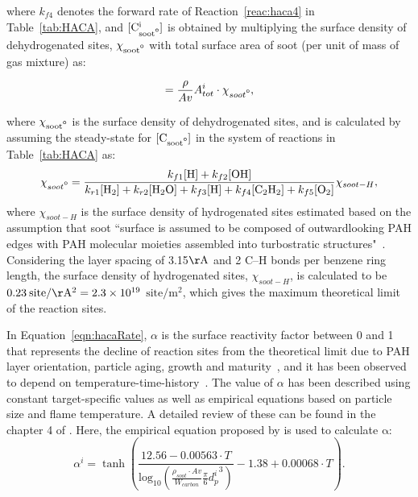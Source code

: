 \noindent  where ${k_{f4}}$ denotes the forward rate of Reaction~\eqref{reac:haca4} in Table~\ref{tab:HACA}, and $\mathrm{[C^i_{soot\mbox{\textdegree}}]}$ is obtained by multiplying the surface density of dehydrogenated sites, $\mathrm{\chi_{soot\mbox{\textdegree}}}$ with total surface area of soot (per unit of mass of gas mixture) as:

\begin{equation}
	[\mathrm{C^i_{soot\mbox{\textdegree}}}] = \frac{\rho}{Av}A^i_{tot}\cdot\chi_{soot\mbox{\textdegree}}
	\label{eqn:csoot0},
\end{equation}

\noindent where $\mathrm{\chi_{soot\mbox{\textdegree}}}$ is the surface density of dehydrogenated sites, and is calculated by assuming the steady-state for $\mathrm{[C_{soot\mbox{\textdegree}}]}$ in the system of reactions in Table~\ref{tab:HACA} as:
\begin{equation}
	\chi_{soot{\mbox{\textdegree}}} = 
	\frac
	{k_{f1}[\mathrm{H}]+k_{f2}[\mathrm{OH}]}
	{k_{r1}[\mathrm{H_2}]+k_{r2}[\mathrm{H_2O}]+k_{f3}[\mathrm{H}]+k_{f4}[\mathrm{C_2H_2}]+k_{f5}[\mathrm{O_2}]} \chi_{soot-{H}},
	\label{eqn:chisoot0}
\end{equation}
\noindent where ${\chi_{soot-{H}}}$ is the surface density of hydrogenated sites estimated based on the assumption that soot ``surface is assumed to be composed of outwardlooking PAH edges with PAH molecular moieties assembled into turbostratic structures"~\citep{frenklach2019new}. Considering the layer spacing of 3.15$\mathrm{\AA}$ and 2 C–H bonds per benzene ring length, the surface density of hydrogenated sites, $\chi_{{soot}-H}$, is calculated to be $0.23\:\mathrm{site/\AA^2}=2.3\times10^{19}$ $ \mathrm{site/m^2}$, which gives the maximum theoretical limit of the reaction sites.

In Equation~\eqref{eqn:hacaRate}, $\alpha$ is the surface reactivity factor between 0 and 1 that represents the decline of reaction sites from the theoretical limit due to PAH layer orientation, particle aging, growth and maturity~\citep{haynes1982surface, harris1985chemical}, and it has been observed to depend on temperature-time-history~\cite{homann1985formation, dasch1985decay}. The value of $\alpha$ has been described using constant target-specific values as well as empirical equations based on particle size and flame temperature. A detailed review of these can be found in the chapter 4 of \citep{veshkini2015understanding}.  Here, the empirical equation proposed by \citet{appel2000kinetic} is used to calculate $\mathrm{\alpha}$:
\begin{equation}
	\alpha^i = \tanh 
	\left(
	\frac{12.56 - 0.00563\cdot T}
	{\mbox{log}_{10}
		\left( \frac{\rho_{soot}\cdot Av}{W_{carbon}} \frac{\pi}{6}{d^i_p}^3 \right) } -1.38+0.00068\cdot T
	\right)
	\label{eqn:alpha}.
\end{equation}

